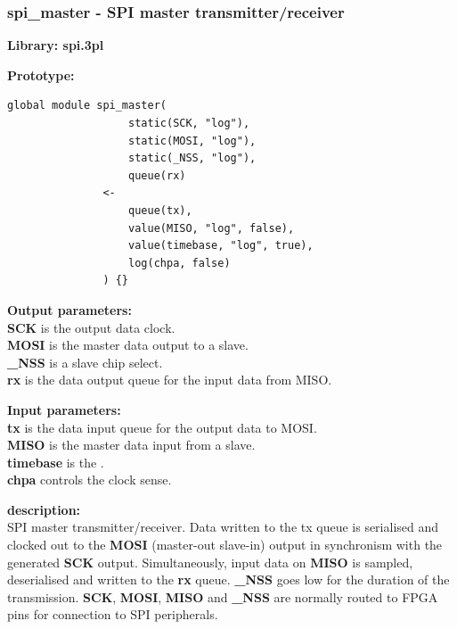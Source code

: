         \subsubsection{spi\_master - SPI master transmitter/receiver}\label{sec:lmspimaster}

            {\bf Library: spi.3pl}

            {\bf Prototype:} \\
            \vsp
            \begin{lstlisting}[gobble=12, language=threepl]
               global module spi_master(
                   static(SCK, "log"),
                   static(MOSI, "log"),
                   static(_NSS, "log"),
                   queue(rx)
               <-
                   queue(tx),
                   value(MISO, "log", false),
                   value(timebase, "log", true),
                   log(chpa, false)
               ) {}
            \end{lstlisting}

            {\bf Output parameters:} \\
            {\bf SCK} is the output data clock.\\
            {\bf MOSI} is the master data output to a slave. \\
            {\bf \_NSS} is a slave chip select. \\
            {\bf rx} is the data output queue for the input data from MISO.

            {\bf Input parameters:} \\
            {\bf tx} is the data input queue for the output data to MOSI.\\
            {\bf MISO} is the master data input from a slave.\\
            {\bf timebase} is the .\\
            {\bf chpa} controls the clock sense.

            {\bf description:} \\
            SPI master transmitter/receiver. Data written to the tx queue is
            serialised and clocked out to the {\bf MOSI} (master-out slave-in)
            output in synchronism with the generated {\bf SCK} output.
            Simultaneously, input data on {\bf MISO} is sampled, deserialised and
            written to the {\bf rx} queue. {\bf \_NSS} goes low for the duration of
            the transmission. {\bf SCK}, {\bf MOSI}, {\bf MISO} and {\bf \_NSS} are
            normally routed to FPGA pins for connection to SPI peripherals.

